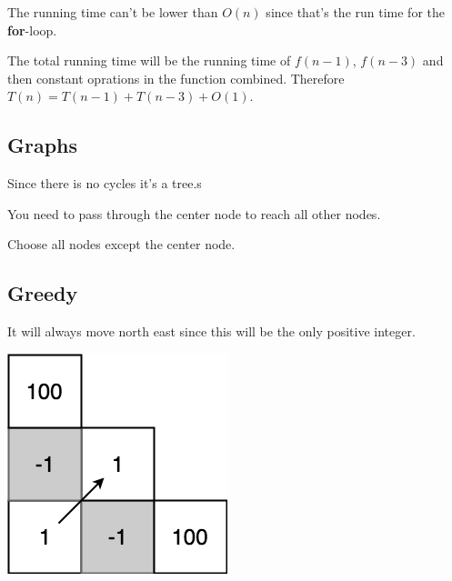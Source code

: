\documentclass[a4paper]{article}
\newenvironment{task}[1]
{
	\begin{description}[align=right]
		\item [#1]
}{		%
	\end{description}
}
\DeclareMathOperator{\*}{\cdot}
\begin{document}
\begin{task}{(b)}
	 The running time can't be lower than $O(n)$ since that's the run time for the \textbf{for}-loop. 
\end{task}

\begin{task}{4. (a)}
	 The total running time will be the running time of $f(n-1)$, $f(n-3)$ and then constant oprations in the function combined. Therefore $T(n)=T(n-1)+T(n-3)+O(1)$.
\end{task}

\begin{task}{(b)}
\end{task}

\subsection*{Graphs}

\begin{task}{5. (a)}
\end{task}

\begin{task}{(b)}
\end{task}

\begin{task}{(c)}
	 Since there is no cycles it's a tree.s
\end{task}

\begin{task}{(d)}
	 You need to pass through the center node to reach all other nodes.
\end{task}

\begin{task}{(e)}
	 Choose all nodes except the center node.
\end{task}

\subsection*{Greedy}

\begin{task}{6. (a)}
	It will always move north east since this will be the only positive integer.
	
	\includegraphics[scale=0.3]{110525-6a.png}
\end{task}
\end{document}
